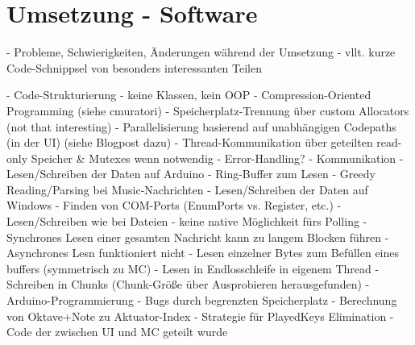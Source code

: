 
\chapter{Umsetzung - Software} \label{umsetzungSW}

\nocite{*}
- Probleme, Schwierigkeiten, Änderungen während der Umsetzung \newline
- vllt. kurze Code-Schnippsel von besonders interessanten Teilen

- Code-Strukturierung \newline
	- keine Klassen, kein OOP \newline
	- Compression-Oriented Programming (siehe cmuratori) \newline
	- Speicherplatz-Trennung über custom Allocators (not that interesting) \newline
	- Parallelisierung basierend auf unabhängigen Codepaths (in der UI) (siehe Blogpost dazu) \newline
	- Thread-Kommunikation über geteilten read-only Speicher \& Mutexes wenn notwendig \newline
	- Error-Handling? \newline
- Kommunikation \newline
	- Lesen/Schreiben der Daten auf Arduino \newline
		- Ring-Buffer zum Lesen \newline
		- Greedy Reading/Parsing bei Music-Nachrichten \newline
	- Lesen/Schreiben der Daten auf Windows \newline
		- Finden von COM-Ports (EnumPorts vs. Register, etc.) \newline
		- Lesen/Schreiben wie bei Dateien \newline
		- keine native Möglichkeit fürs Polling \newline
		- Synchrones Lesen einer gesamten Nachricht kann zu langem Blocken führen \newline
		- Asynchrones Lesn funktioniert nicht \newline
		- Lesen einzelner Bytes zum Befüllen eines buffers (symmetrisch zu MC) \newline
		- Lesen in Endlosschleife in eigenem Thread \newline
		- Schreiben in Chunks (Chunk-Größe über Ausprobieren herausgefunden) \newline
- Arduino-Programmierung \newline
	- Bugs durch begrenzten Speicherplatz \newline
	- Berechnung von Oktave+Note zu Aktuator-Index \newline
	- Strategie für PlayedKeys Elimination \newline
- Code der zwischen UI und MC geteilt wurde \newline

